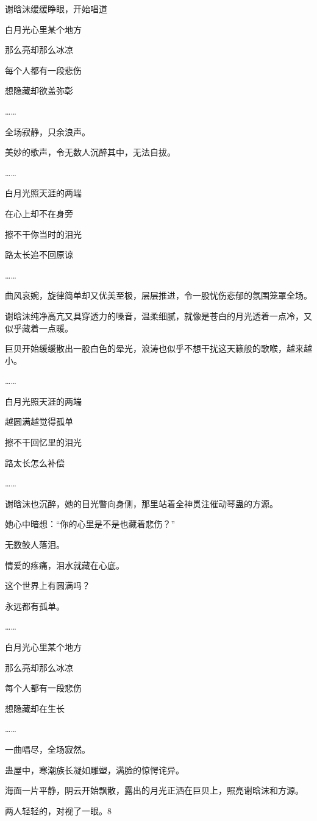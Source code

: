\begin{this_body}
谢晗沫缓缓睁眼，开始唱道

白月光心里某个地方

那么亮却那么冰凉

每个人都有一段悲伤

想隐藏却欲盖弥彰

……

全场寂静，只余浪声。

美妙的歌声，令无数人沉醉其中，无法自拔。

……

白月光照天涯的两端

在心上却不在身旁

擦不干你当时的泪光

路太长追不回原谅

……

曲风哀婉，旋律简单却又优美至极，层层推进，令一股忧伤悲郁的氛围笼罩全场。

谢晗沫纯净高亢又具穿透力的嗓音，温柔细腻，就像是苍白的月光透着一点冷，又似乎藏着一点暖。

巨贝开始缓缓散出一股白色的晕光，浪涛也似乎不想干扰这天籁般的歌喉，越来越小。

……

白月光照天涯的两端

越圆满越觉得孤单

擦不干回忆里的泪光

路太长怎么补偿

……

谢晗沫也沉醉，她的目光瞥向身侧，那里站着全神贯注催动琴蛊的方源。

她心中暗想：“你的心里是不是也藏着悲伤？”

无数鲛人落泪。

情爱的疼痛，泪水就藏在心底。

这个世界上有圆满吗？

永远都有孤单。

……

白月光心里某个地方

那么亮却那么冰凉

每个人都有一段悲伤

想隐藏却在生长

……

一曲唱尽，全场寂然。

蛊屋中，寒潮族长凝如雕塑，满脸的惊愕诧异。

海面一片平静，阴云开始飘散，露出的月光正洒在巨贝上，照亮谢晗沫和方源。

两人轻轻的，对视了一眼。8

\end{this_body}

